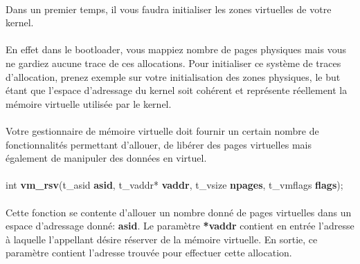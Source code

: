 \documentclass[10pt,a4wide]{article}
\begin{document}
\paragraph{}

Dans un premier temps, il vous faudra initialiser les zones virtuelles
de votre kernel.

\paragraph{}

En effet dans le bootloader, vous mappiez nombre de pages physiques
mais vous ne gardiez aucune trace de ces allocations. Pour initialiser
ce syst\`eme de traces d'allocation, prenez exemple sur votre
initialisation des zones physiques, le but \'etant que l'espace
d'adressage du kernel soit coh\'erent et repr\'esente r\'eellement
la m\'emoire virtuelle utilis\'ee par le kernel.

\paragraph{}

Votre gestionnaire de m\'emoire virtuelle doit fournir un certain nombre
de fonctionnalit\'es permettant d'allouer, de lib\'erer des pages
virtuelles mais \'egalement de manipuler des donn\'ees en virtuel.

\paragraph{}

\hspace{1.5cm}int \textbf{vm\_rsv}(t\_asid \textbf{asid},
                                   t\_vaddr* \textbf{vaddr},
                                   t\_vsize \textbf{npages},
                                   t\_vmflags \textbf{flags});

\paragraph{}

Cette fonction se contente d'allouer un nombre donn\'e de pages virtuelles
dans un espace d'adressage donn\'e: \textbf{asid}. Le param\`etre
\textbf{*vaddr} contient en entr\'ee l'adresse \`a laquelle l'appellant
d\'esire r\'eserver de la m\'emoire virtuelle. En sortie, ce param\`etre
contient l'adresse trouv\'ee pour effectuer cette allocation.

\paragraph{}
\end{document}
